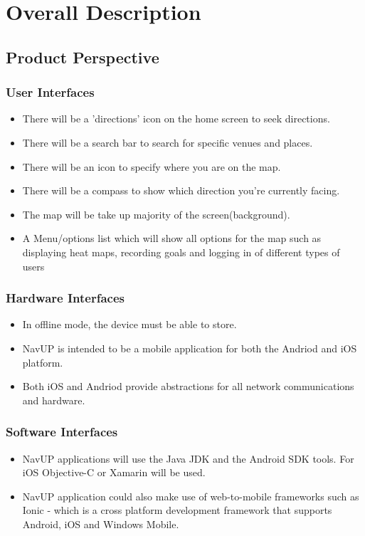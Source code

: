 \documentclass[runningheads,a4paper]{article}
\begin{document}
\section{Overall Description}

\subsection{Product Perspective}

\subsubsection{User Interfaces}
\begin{itemize}
	\item There will be a 'directions' icon on the home screen to seek directions.
	\item There will be a search bar to search for specific venues and places.
	\item There will be an icon to specify where you are on the map.
	\item There will be a compass to show which direction you’re currently facing.
	\item The map will be take up majority of the screen(background).
	\item A Menu/options list which will show all options for the map such as displaying heat maps, recording goals and logging in of different types of users
	
\end{itemize}
\subsubsection{Hardware Interfaces}
\begin{itemize}
	\item In offline mode, the device must be able to store.
	\item NavUP is intended to be a mobile application for both the Andriod and iOS platform.
	\item Both iOS and Andriod provide abstractions for all network communications and hardware.
	
\end{itemize}
\subsubsection{Software Interfaces}
\begin{itemize}
	\item NavUP applications will use the Java JDK and the Android SDK tools. For iOS Objective-C or Xamarin will be used.
	
	\item NavUP application could also make use of web-to-mobile frameworks such as Ionic - which is a cross platform development framework that supports Android, iOS and Windows Mobile.
	
\end{itemize}
\end{document}
